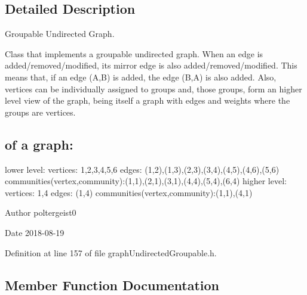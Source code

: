 \subsection{Detailed Description}
Groupable Undirected Graph. 

Class that implements a groupable undirected graph. When an edge is added/removed/modified, its mirror edge is also added/removed/modified. This means that, if an edge (A,B) is added, the edge (B,A) is also added. Also, vertices can be individually assigned to groups and, those groups, form an higher level view of the graph, being itself a graph with edges and weights where the groups are vertices.\hypertarget{classGraphUndirectedGroupable_Example}{}\subsection{of a graph\+:}\label{classGraphUndirectedGroupable_Example}
lower level\+: vertices\+: 1,2,3,4,5,6 edges\+: (1,2),(1,3),(2,3),(3,4),(4,5),(4,6),(5,6) communities(vertex,community)\+:(1,1),(2,1),(3,1),(4,4),(5,4),(6,4) higher level\+: vertices\+: 1,4 edges\+: (1,4) communities(vertex,community)\+:(1,1),(4,1)

\begin{DoxyAuthor}{Author}
poltergeist0
\end{DoxyAuthor}
\begin{DoxyDate}{Date}
2018-\/08-\/19 
\end{DoxyDate}


Definition at line 157 of file graph\+Undirected\+Groupable.\+h.



\subsection{Member Function Documentation}
\mbox{\label{classGraphUndirectedGroupable_a8c010517bff903a50807e6e8ad8cc6db}} 
